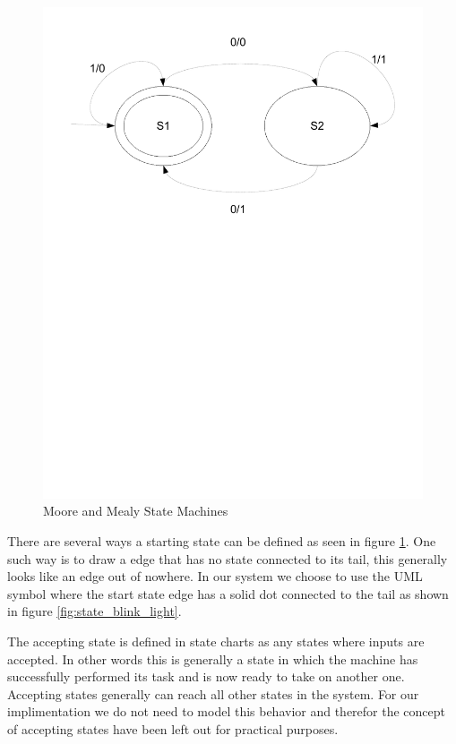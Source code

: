 \begin{figure}[htp]
    \includegraphics[trim= 10mm 150mm 10mm 10mm, clip ,width=\imgmedsmall]{./images/state_mealy.pdf}    
    \caption{Moore and Mealy State Machines}
    \label{fig:state_moore_mealy}
\end{figure}


There are several ways a starting state can be defined as seen in figure \ref{fig:state_moore_mealy}.
One such way is to draw a edge that has no state connected to its tail, this generally looks like an edge out of nowhere. In our system we choose to use the UML symbol where the start state edge has a solid dot connected to the tail as shown in figure \ref{fig:state_blink_light}.

The accepting state is defined in state charts as any states where inputs are accepted. In other words this is generally a state in which the machine has successfully performed its task and is now ready to take on another one. Accepting states generally can reach all other states in the system. For our implimentation we do not need to model this behavior and therefor the concept of accepting states have been left out for practical purposes.

